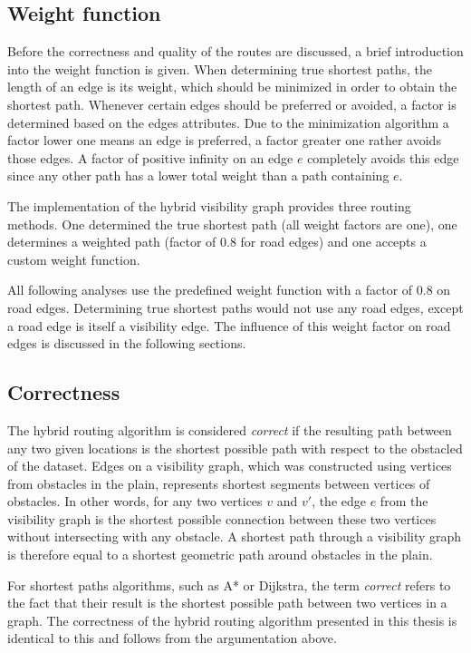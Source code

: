 	\subsection{Weight function}
	
		Before the correctness and quality of the routes are discussed, a brief introduction into the weight function is given.
		When determining true shortest paths, the length of an edge is its weight, which should be minimized in order to obtain the shortest path.
		Whenever certain edges should be preferred or avoided, a factor is determined based on the edges attributes.
		Due to the minimization algorithm a factor lower one means an edge is preferred, a factor greater one rather avoids those edges.
		A factor of positive infinity on an edge $e$ completely avoids this edge since any other path has a lower total weight than a path containing $e$.
		
		The implementation of the hybrid visibility graph provides three routing methods.
		One determined the true shortest path (all weight factors are one), one determines a weighted path (factor of 0.8 for road edges) and one accepts a custom weight function.
		
		All following analyses use the predefined weight function with a factor of 0.8 on road edges.
		Determining true shortest paths would not use any road edges, except a road edge is itself a visibility edge.
		The influence of this weight factor on road edges is discussed in the following sections.

	\subsection{Correctness}
	\label{subsec:correctness}
	
		The hybrid routing algorithm is considered \emph{correct} if the resulting path between any two given locations is the shortest possible path with respect to the obstacled of the dataset.
		Edges on a visibility graph, which was constructed using vertices from obstacles in the plain, represents shortest segments between vertices of obstacles.
		In other words, for any two vertices $v$ and $v'$, the edge $e$ from the visibility graph is the shortest possible connection between these two vertices without intersecting with any obstacle.
		A shortest path through a visibility graph is therefore equal to a shortest geometric path around obstacles in the plain.
		
		For shortest paths algorithms, such as A* or Dijkstra, the term \emph{correct} refers to the fact that their result is the shortest possible path between two vertices in a graph.
		The correctness of the hybrid routing algorithm presented in this thesis is identical to this and follows from the argumentation above.
		
